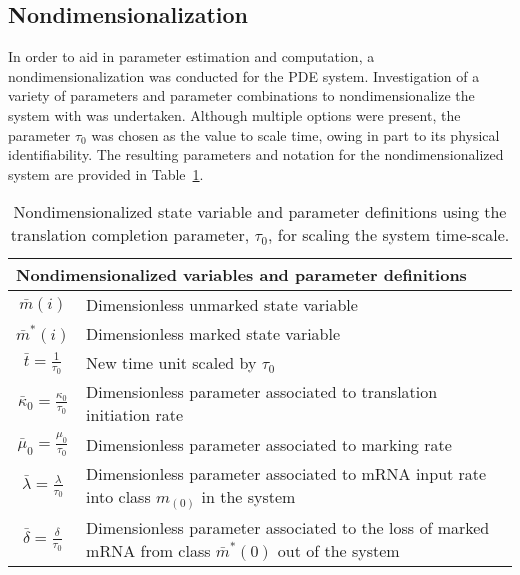 \documentclass[review]{elsarticle}
\begin{document}
\subsection{Nondimensionalization}
In order to aid in parameter estimation and computation, a nondimensionalization was conducted for the PDE system.  Investigation of a variety of parameters and parameter combinations to nondimensionalize the system with was undertaken.
Although multiple options were present, the parameter $\tau_0$ was chosen as the value to scale time, owing in part to its physical identifiability.
The resulting parameters and notation for the nondimensionalized system are provided in Table~\ref{tab:nond_params}.


\begin{table}
\begin{tabular}{|c l|}
\hline
\multicolumn{2}{|l|}{\textbf{Nondimensionalized variables and parameter definitions}} \\ \hline \hline
$\bar{m}(i)$ &  Dimensionless unmarked state variable \\
$\bar{m}^{*}(i)$ &  Dimensionless marked state variable \\
$\bar{t}=\frac{1}{\tau_{0}}$ & New time unit scaled by $\tau_{0}$ \\ 
$\bar{\kappa}_0=\frac{\kappa_{0}}{\tau_{0}}$ & Dimensionless parameter
associated to translation initiation rate \\
$\bar{\mu}_0=\frac{\mu_{0}}{\tau_{0}}$ & Dimensionless parameter associated
to marking rate \\
$\bar{\lambda}=\frac{\lambda}{\tau_{0}}$ & Dimensionless parameter associated
to mRNA input rate into class $m_(0)$ in the system\\
$\bar{\delta}=\frac{\delta}{\tau_{0}}$ & Dimensionless parameter associated
to the loss of marked mRNA from class $\bar{m}^*(0)$ out of the system\\ \hline
\end{tabular}
\caption{Nondimensionalized state variable and parameter definitions using the translation completion parameter, $\tau_0$, for scaling the system time-scale.}
\label{tab:nond_params}
\end{table}
\end{document}
